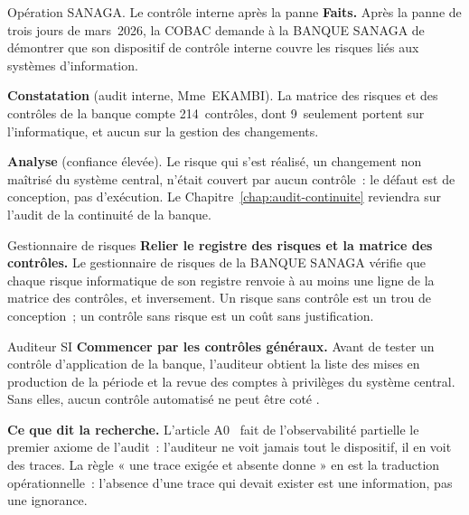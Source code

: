 \begin{boxscenario}{Opération SANAGA. Le contrôle interne après la panne}
\textbf{Faits.} Après la panne de trois jours de mars~2026, la COBAC demande
à la BANQUE SANAGA de démontrer que son dispositif de contrôle interne
couvre les risques liés aux systèmes d'information.

\medskip
\textbf{Constatation} (audit interne, Mme~EKAMBI). La matrice des risques
et des contrôles de la banque compte 214~contrôles, dont 9~seulement portent
sur l'informatique, et aucun sur la gestion des changements.

\medskip
\textbf{Analyse} (confiance élevée). Le risque qui s'est réalisé, un
changement non maîtrisé du système central, n'était couvert par aucun
contrôle~: le défaut est de conception, pas d'exécution. Le
Chapitre~\ref{chap:audit-continuite} reviendra sur l'audit de la continuité
de la banque.
\end{boxscenario}

\begin{boxmetier}{Gestionnaire de risques}
\textbf{Relier le registre des risques et la matrice des contrôles.} Le
gestionnaire de risques de la BANQUE SANAGA vérifie que chaque risque
informatique de son registre renvoie à au moins une ligne de la matrice des
contrôles, et inversement. Un risque sans contrôle est un trou de
conception~; un contrôle sans risque est un coût sans justification.
\end{boxmetier}

\begin{boxmetier}{Auditeur SI}
\textbf{Commencer par les contrôles généraux.} Avant de tester un contrôle
d'application de la banque, l'auditeur obtient la liste des mises en
production de la période et la revue des comptes à privilèges du système
central. Sans elles, aucun contrôle automatisé ne peut être coté \OUI{}.
\end{boxmetier}

\begin{boxinfo}
\textbf{Ce que dit la recherche.} L'article A0~\cite{minka2026auditologie}
fait de l'observabilité partielle le premier axiome de l'audit~: l'auditeur
ne voit jamais tout le dispositif, il en voit des traces. La règle « une
trace exigée et absente donne \NON{} » en est la traduction
opérationnelle~: l'absence d'une trace qui devait exister est une
information, pas une ignorance.
\end{boxinfo}

\separateur

